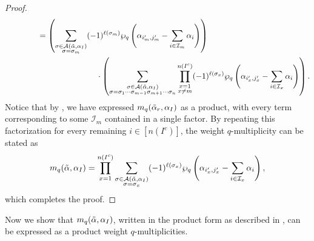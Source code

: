 \documentclass[10pt]{article}
\newcommand{\hr}[0]{\Tilde{\alpha}}
\newcommand{\newmu}[0]{\alpha_I}
\newcommand{\thealtset}[0]{\mathcal{A}(\hr,\newmu)}
\newcommand{\qpartition}[1]{\wp_q\left(#1\right)}
\begin{document}
\begin{proof}
\begin{align}
        &\qquad\qquad=\left(\sum_{\substack{\sigma\in\thealtset\\ \sigma=\sigma_m}}(-1)^{\ell(\sigma_m)}\qpartition{\alpha_{i'_m,j'_m}-\sum_{i\in\mathcal{I}_m}\alpha_i}\right)\notag\\
        &\hspace{4cm}\cdot\left(\sum_{\substack{\sigma\in\thealtset\\ \sigma=\sigma_1\cdots \sigma_{m-1}\sigma_{m+1}\cdots\sigma_n}}\prod_{\substack{x=1\\x\neq m}}^{n(I^c)} (-1)^{\ell(\sigma_x)}\qpartition{\alpha_{i'_x,j'_x}-\sum_{i\in\mathcal{I}_x}\alpha_i}\right).\label{break into product 3}
    \end{align}
    Notice that by , we have expressed $m_q(\hr_r,\alpha_I)$ as a product, with every term corresponding to some $\mathcal{I}_m$ contained in a single factor.
    By repeating this factorization for every remaining $i\in[n(I^c)]$, the weight $q$-multiplicity can be stated as
    \[m_q(\hr,\alpha_I)=\prod_{x=1}^{n(I^c)}\sum_{\substack{\sigma\in\mathcal{A}(\hr,\alpha_I) \\ \sigma=\sigma_x}}(-1)^{\ell(\sigma_x)}\qpartition{\alpha_{i'_x,j'_x}-\sum_{i\in\mathcal{I}_x}\alpha_i},\]
    which completes the proof.
\end{proof}
Now we show that $m_q(\hr,\alpha_I)$, written in the product form as described in , can be expressed as a product weight $q$-multiplicities.
\end{document}

